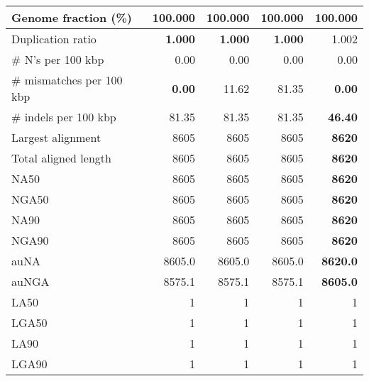 \documentclass[12pt,a4paper]{article}
\begin{document}
\begin{table}[ht]
\begin{center}
\begin{tabular}{|l*{4}{|r}|}
Genome fraction (\%) & 100.000 & 100.000 & 100.000 & 100.000 \\ \hline
Duplication ratio & {\bf 1.000} & {\bf 1.000} & {\bf 1.000} & 1.002 \\ \hline
\# N's per 100 kbp & 0.00 & 0.00 & 0.00 & 0.00 \\ \hline
\# mismatches per 100 kbp & {\bf 0.00} & 11.62 & 81.35 & {\bf 0.00} \\ \hline
\# indels per 100 kbp & 81.35 & 81.35 & 81.35 & {\bf 46.40} \\ \hline
Largest alignment & 8605 & 8605 & 8605 & {\bf 8620} \\ \hline
Total aligned length & 8605 & 8605 & 8605 & {\bf 8620} \\ \hline
NA50 & 8605 & 8605 & 8605 & {\bf 8620} \\ \hline
NGA50 & 8605 & 8605 & 8605 & {\bf 8620} \\ \hline
NA90 & 8605 & 8605 & 8605 & {\bf 8620} \\ \hline
NGA90 & 8605 & 8605 & 8605 & {\bf 8620} \\ \hline
auNA & 8605.0 & 8605.0 & 8605.0 & {\bf 8620.0} \\ \hline
auNGA & 8575.1 & 8575.1 & 8575.1 & {\bf 8605.0} \\ \hline
LA50 & 1 & 1 & 1 & 1 \\ \hline
LGA50 & 1 & 1 & 1 & 1 \\ \hline
LA90 & 1 & 1 & 1 & 1 \\ \hline
LGA90 & 1 & 1 & 1 & 1 \\ \hline
\end{tabular}
\end{center}
\end{table}
\end{document}
